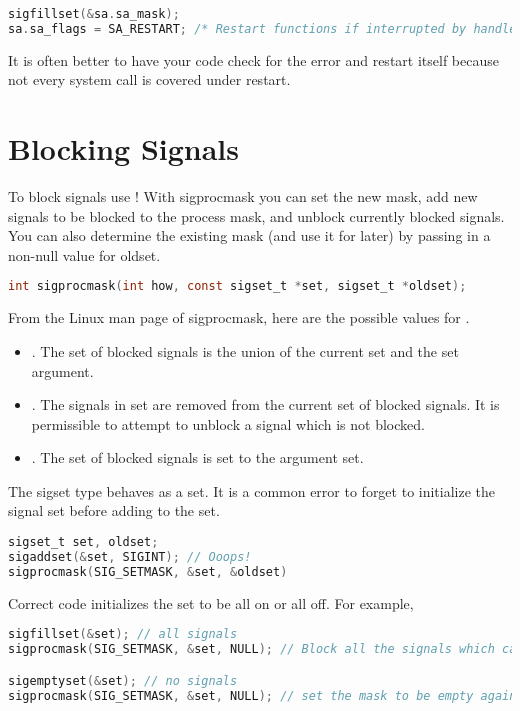 \begin{lstlisting}[language=C]
sigfillset(&sa.sa_mask);
sa.sa_flags = SA_RESTART; /* Restart functions if interrupted by handler */
\end{lstlisting}

It is often better to have your code check for the error and restart itself because not every system call is covered under restart.

\section{Blocking Signals}

To block signals use !
With sigprocmask you can set the new mask, add new signals to be blocked to the process mask, and unblock currently blocked signals.
You can also determine the existing mask (and use it for later) by passing in a non-null value for oldset.

\begin{lstlisting}[language=C]
int sigprocmask(int how, const sigset_t *set, sigset_t *oldset);
\end{lstlisting}

From the Linux man page of sigprocmask, here are the possible values for  .

\begin{itemize}
\item {}.
  The set of blocked signals is the union of the current set and the set argument.
\item {}.
  The signals in set are removed from the current set of blocked signals.
  It is permissible to attempt to unblock a signal which is not blocked.
\item {}.
  The set of blocked signals is set to the argument set.
\end{itemize}

The sigset type behaves as a set.
It is a common error to forget to initialize the signal set before adding to the set.

\begin{lstlisting}[language=C]
sigset_t set, oldset;
sigaddset(&set, SIGINT); // Ooops!
sigprocmask(SIG_SETMASK, &set, &oldset)
\end{lstlisting}

Correct code initializes the set to be all on or all off. For example,

\begin{lstlisting}[language=C]
sigfillset(&set); // all signals
sigprocmask(SIG_SETMASK, &set, NULL); // Block all the signals which can be blocked

sigemptyset(&set); // no signals
sigprocmask(SIG_SETMASK, &set, NULL); // set the mask to be empty again
\end{lstlisting}

